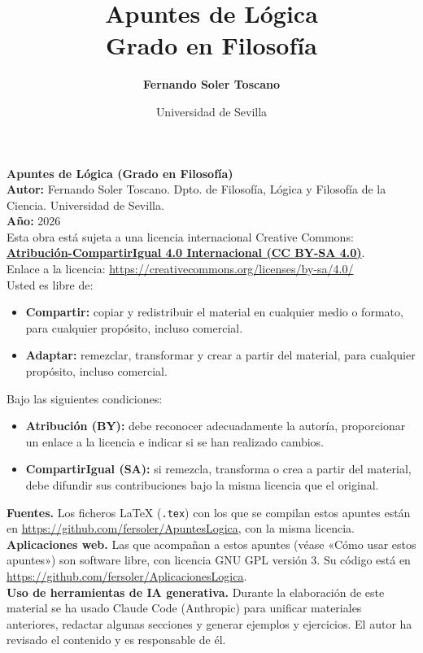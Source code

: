 \documentclass[spanish,11pt,a4paper,openany]{book}
\title{%
  \vspace{-1.2cm}
  {\Huge \textbf{Apuntes de Lógica}}\\[0.35cm]
  {\Large \textbf{Grado en Filosofía}}
}
\author{\textbf{Fernando Soler Toscano}}
\date{Universidad de Sevilla}
\begin{document}
\pagestyle{plain}
\frontmatter

\maketitle
\thispagestyle{empty}
\vspace*{\fill}
\begingroup
\small
\noindent \textbf{Apuntes de Lógica (Grado en Filosofía)}\\
\textbf{Autor:} Fernando Soler Toscano. Dpto. de Filosofía,
Lógica y Filosofía de la Ciencia. Universidad de Sevilla.\\
\textbf{Año:} 2026\\[0.5cm]
\noindent Esta obra está sujeta a una licencia internacional Creative Commons:\\
\textbf{\href{https://creativecommons.org/licenses/by-sa/4.0/}{Atribución-CompartirIgual 4.0 Internacional (CC BY-SA 4.0)}}.\\[0.2cm]
\noindent Enlace a la licencia: \url{https://creativecommons.org/licenses/by-sa/4.0/}\\[0.4cm]
\noindent Usted es libre de:
\begin{itemize}\setlength{\itemsep}{1pt}
    \item \textbf{Compartir:} copiar y redistribuir el material en cualquier medio o formato, para cualquier propósito, incluso comercial.
    \item \textbf{Adaptar:} remezclar, transformar y crear a partir del material, para cualquier propósito, incluso comercial.
\end{itemize}
\noindent Bajo las siguientes condiciones:
\begin{itemize}\setlength{\itemsep}{1pt}
    \item \textbf{Atribución (BY):} debe reconocer adecuadamente la autoría, proporcionar un enlace a la licencia e indicar si se han realizado cambios.
    \item \textbf{CompartirIgual (SA):} si remezcla, transforma o crea a partir del material, debe difundir sus contribuciones bajo la misma licencia que el original.
\end{itemize}
\noindent \textbf{Fuentes.} Los ficheros \LaTeX{} (\texttt{.tex}) con los que se compilan estos apuntes están en \url{https://github.com/fersoler/ApuntesLogica}, con la misma licencia.\\[0.2cm]
\noindent \textbf{Aplicaciones web.} Las que acompañan a estos apuntes (véase «Cómo usar estos apuntes») son software libre, con licencia GNU GPL versión 3. Su código está en \url{https://github.com/fersoler/AplicacionesLogica}.\\[0.2cm]
\noindent \textbf{Uso de herramientas de IA generativa.} Durante la elaboración de este material se ha usado Claude Code (Anthropic) para unificar materiales anteriores, redactar algunas secciones y generar ejemplos y ejercicios. El autor ha revisado el contenido y es responsable de él.
\endgroup
\vspace*{1.5cm}
\clearpage
\end{document}
